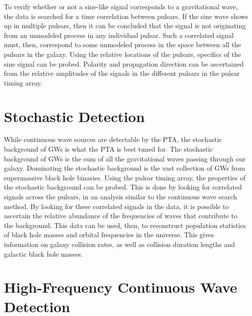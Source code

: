 \documentclass[12pt]{article}
\begin{document}
To verify whether or not a sine-like signal corresponds to a gravitational wave,
the data is searched for a time correlation between pulsars. If the sine wave
shows up in multiple pulsars, then it can be concluded that the signal is not
originating from an unmodeled process in any individual pulsar. Such a
correlated signal must, then, correspond to some unmodeled process in the space
between all the pulsars in the galaxy. Using the relative locations of the
pulsars, specifics of the sine signal can be probed. Polarity and propagation
direction can be ascertained from the relative amplitudes of the signals in the
different pulsars in the pulsar timing array.

\section{Stochastic Detection}
While continuous wave sources are detectable by the PTA, the stochastic
background of GWs is what the PTA is best tuned for. The
stochastic background of GWs is the sum of all the gravitational
waves passing through our galaxy. Dominating the stochastic background is the
vast collection of GWs from supermassive black hole binaries.
Using the pulsar timing array, the properties of the stochastic background can
be probed. This is done by looking for correlated signals across the pulsars, in
an analysis similar to the continuous wave search method. By looking for these
correlated signals in the data, it is possible to ascertain the relative
abundance of the frequencies of waves that contribute to the background. This
data can be used, then, to reconstruct population statistics of black hole masses
and orbital frequencies in the universe. This gives information on galaxy
collision rates, as well as collision duration lengths and galactic black hole masses.

\section{High-Frequency Continuous Wave Detection}
\end{document}
